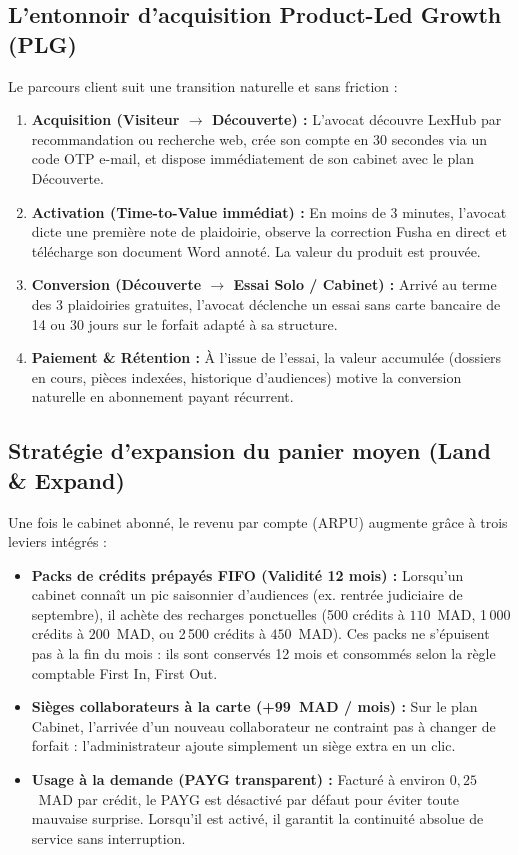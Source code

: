 \subsection{L'entonnoir d'acquisition Product-Led Growth (PLG)}
Le parcours client suit une transition naturelle et sans friction :
\begin{enumerate}[leftmargin=*]
  \item \textbf{Acquisition (Visiteur $\rightarrow$ Découverte) :} L'avocat découvre LexHub par recommandation ou recherche web, crée son compte en 30 secondes via un code OTP e-mail, et dispose immédiatement de son cabinet avec le plan Découverte.
  \item \textbf{Activation (Time-to-Value immédiat) :} En moins de 3 minutes, l'avocat dicte une première note de plaidoirie, observe la correction Fusha en direct et télécharge son document Word annoté. La valeur du produit est prouvée.
  \item \textbf{Conversion (Découverte $\rightarrow$ Essai Solo / Cabinet) :} Arrivé au terme des 3 plaidoiries gratuites, l'avocat déclenche un essai sans carte bancaire de 14 ou 30 jours sur le forfait adapté à sa structure.
  \item \textbf{Paiement & Rétention :} À l'issue de l'essai, la valeur accumulée (dossiers en cours, pièces indexées, historique d'audiences) motive la conversion naturelle en abonnement payant récurrent.
\end{enumerate}

\subsection{Stratégie d'expansion du panier moyen (Land \& Expand)}
Une fois le cabinet abonné, le revenu par compte (ARPU) augmente grâce à trois leviers intégrés :
\begin{itemize}[leftmargin=*]
  \item \textbf{Packs de crédits prépayés FIFO (Validité 12 mois) :} Lorsqu'un cabinet connaît un pic saisonnier d'audiences (ex. rentrée judiciaire de septembre), il achète des recharges ponctuelles (500 crédits à $110$~MAD, 1\,000 crédits à $200$~MAD, ou 2\,500 crédits à $450$~MAD). Ces packs ne s'épuisent pas à la fin du mois : ils sont conservés 12 mois et consommés selon la règle comptable First In, First Out.
  \item \textbf{Sièges collaborateurs à la carte (+99~MAD / mois) :} Sur le plan Cabinet, l'arrivée d'un nouveau collaborateur ne contraint pas à changer de forfait : l'administrateur ajoute simplement un siège extra en un clic.
  \item \textbf{Usage à la demande (PAYG transparent) :} Facturé à environ $0{,}25$~MAD par crédit, le PAYG est désactivé par défaut pour éviter toute mauvaise surprise. Lorsqu'il est activé, il garantit la continuité absolue de service sans interruption.
\end{itemize}

